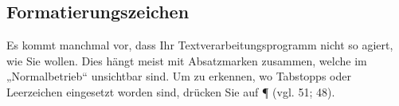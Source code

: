 \documentclass[a4paper, 11pt]{scrartcl}
\begin{document}
	\subsection*{Formatierungszeichen}
	\begin{justify}
		Es kommt manchmal vor, dass Ihr Textverarbeitungsprogramm nicht so agiert, wie Sie wollen. Dies hängt meist mit Absatzmarken zusammen, welche im „Normalbetrieb“ unsichtbar sind. Um zu erkennen, wo Tabstopps oder Leerzeichen eingesetzt worden sind, drücken Sie auf ¶ (vgl. 51; 48).
	\end{justify}
\end{document}

